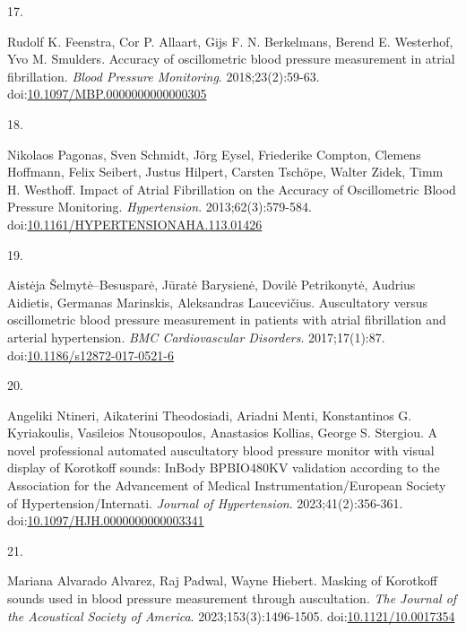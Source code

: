 \documentclass[
  12pt,
  letterpaper,
  openany,
  oneside]{book}
\newlength{\cslhangindent}
\newlength{\csllabelwidth}
\newenvironment{CSLReferences}[2] %
 {\begin{list}{}{%
  \setlength{\itemindent}{0pt}
  \setlength{\leftmargin}{0pt}
  \setlength{\parsep}{0pt}
  \ifodd #1
   \setlength{\leftmargin}{\cslhangindent}
   \setlength{\itemindent}{-1\cslhangindent}
  \fi
  \setlength{\itemsep}{#2\baselineskip}}}
 {\end{list}}
\newcommand{\CSLLeftMargin}[1]{\parbox[t]{\csllabelwidth}{\strut#1\strut}}
\newcommand{\CSLRightInline}[1]{\parbox[t]{\linewidth - \csllabelwidth}{\strut#1\strut}}
\begin{document}
\begin{CSLReferences}{0}{1}
\CSLLeftMargin{17. }%
\CSLRightInline{Rudolf K. Feenstra, Cor P. Allaart, Gijs F. N.
Berkelmans, Berend E. Westerhof, Yvo M. Smulders. Accuracy of
oscillometric blood pressure measurement in atrial fibrillation.
\emph{Blood Pressure Monitoring}. 2018;23(2):59-63.
doi:\href{https://doi.org/10.1097/MBP.0000000000000305}{10.1097/MBP.0000000000000305}}

\CSLLeftMargin{18. }%
\CSLRightInline{Nikolaos Pagonas, Sven Schmidt, Jörg Eysel, Friederike
Compton, Clemens Hoffmann, Felix Seibert, Justus Hilpert, Carsten
Tschöpe, Walter Zidek, Timm H. Westhoff. Impact of {Atrial}
{Fibrillation} on the {Accuracy} of {Oscillometric} {Blood} {Pressure}
{Monitoring}. \emph{Hypertension}. 2013;62(3):579-584.
doi:\href{https://doi.org/10.1161/HYPERTENSIONAHA.113.01426}{10.1161/HYPERTENSIONAHA.113.01426}}

\CSLLeftMargin{19. }%
\CSLRightInline{Aistėja Šelmytė--Besusparė, Jūratė Barysienė, Dovilė
Petrikonytė, Audrius Aidietis, Germanas Marinskis, Aleksandras
Laucevičius. Auscultatory versus oscillometric blood pressure
measurement in patients with atrial fibrillation and arterial
hypertension. \emph{BMC Cardiovascular Disorders}. 2017;17(1):87.
doi:\href{https://doi.org/10.1186/s12872-017-0521-6}{10.1186/s12872-017-0521-6}}

\CSLLeftMargin{20. }%
\CSLRightInline{Angeliki Ntineri, Aikaterini Theodosiadi, Ariadni Menti,
Konstantinos G. Kyriakoulis, Vasileios Ntousopoulos, Anastasios Kollias,
George S. Stergiou. A novel professional automated auscultatory blood
pressure monitor with visual display of {Korotkoff} sounds: {InBody}
{BPBIO480KV} validation according to the {Association} for the
{Advancement} of {Medical} {Instrumentation}/{European} {Society} of
{Hypertension}/{Internati}. \emph{Journal of Hypertension}.
2023;41(2):356-361.
doi:\href{https://doi.org/10.1097/HJH.0000000000003341}{10.1097/HJH.0000000000003341}}

\CSLLeftMargin{21. }%
\CSLRightInline{Mariana Alvarado Alvarez, Raj Padwal, Wayne Hiebert.
Masking of {Korotkoff} sounds used in blood pressure measurement through
auscultation. \emph{The Journal of the Acoustical Society of America}.
2023;153(3):1496-1505.
doi:\href{https://doi.org/10.1121/10.0017354}{10.1121/10.0017354}}


\end{CSLReferences}
\end{document}
